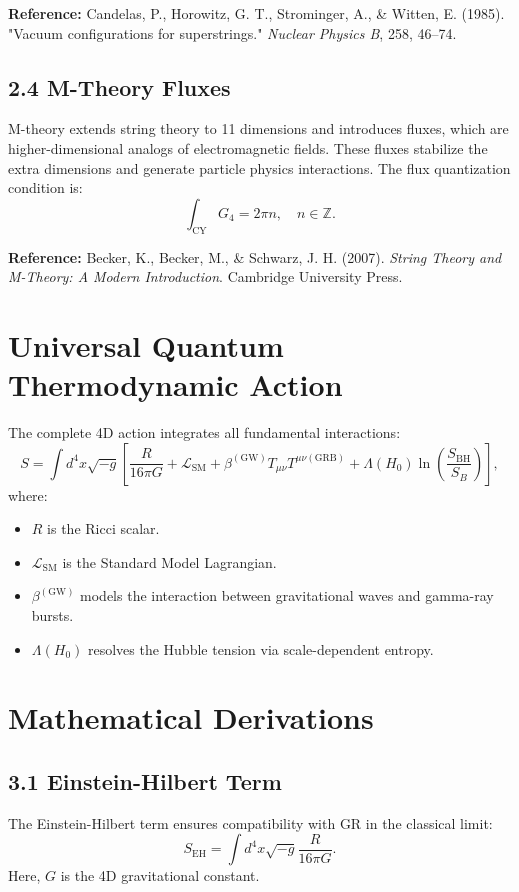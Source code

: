 \documentclass[12pt,a4paper]{article}
\begin{document}
\textbf{Reference:} Candelas, P., Horowitz, G. T., Strominger, A., \& Witten, E. (1985). "Vacuum configurations for superstrings." \textit{Nuclear Physics B}, 258, 46–74.

\subsection*{2.4 M-Theory Fluxes}
M-theory extends string theory to 11 dimensions and introduces fluxes, which are higher-dimensional analogs of electromagnetic fields. These fluxes stabilize the extra dimensions and generate particle physics interactions. The flux quantization condition is:
$$
\int_{\text{CY}} G_4 = 2\pi n, \quad n \in \mathbb{Z}.
$$

\textbf{Reference:} Becker, K., Becker, M., \& Schwarz, J. H. (2007). \textit{String Theory and M-Theory: A Modern Introduction}. Cambridge University Press.

\section*{Universal Quantum Thermodynamic Action}
The complete 4D action integrates all fundamental interactions:
$$
S = \int d^4x \sqrt{-g} \left[ \frac{R}{16\pi G} + \mathcal{L}_{\text{SM}} + \beta^{(\text{GW})} T_{\mu\nu} T^{\mu\nu (\text{GRB})} + \Lambda(H_0) \ln\left(\frac{S_{\text{BH}}}{S_B}\right) \right],
$$
where:
\begin{itemize}
    \item $R$ is the Ricci scalar.
    \item $\mathcal{L}_{\text{SM}}$ is the Standard Model Lagrangian.
    \item $\beta^{(\text{GW})}$ models the interaction between gravitational waves and gamma-ray bursts.
    \item $\Lambda(H_0)$ resolves the Hubble tension via scale-dependent entropy.
\end{itemize}

\section*{Mathematical Derivations}

\subsection*{3.1 Einstein-Hilbert Term}
The Einstein-Hilbert term ensures compatibility with GR in the classical limit:
$$
S_{\text{EH}} = \int d^4x \sqrt{-g} \frac{R}{16\pi G}.
$$
Here, $G$ is the 4D gravitational constant.
\end{document}
